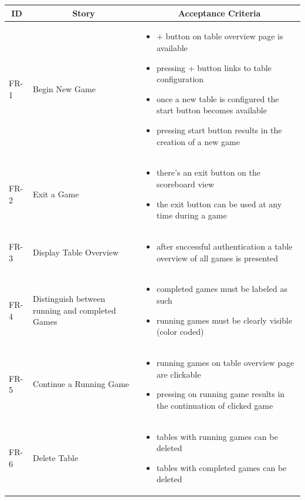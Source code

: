 \begin{longtable} { | m{1.25cm} | m{5.75cm} | m{6cm} | }
    \hline
    \multicolumn{1}{|c|}{\textbf{ID}} & \multicolumn{1}{|c|}{ \textbf{Story} } & \multicolumn{1}{|c|}{ \textbf{Acceptance Criteria} } \\
    \endhead
    \hline
    FR-1 & Begin New Game & \begin{itemize}[-]
        \item + button on table overview page is available
        \item pressing + button links to table configuration
        \item once a new table is configured the start button becomes available
        \item pressing start button results in the creation of a new game
    \end{itemize}\\
    \hline
    FR-2 & Exit a Game & \begin{itemize}[-]
        \item there's an exit button on the scoreboard view
        \item the exit button can be used at any time during a game
    \end{itemize}\\
    \hline
    FR-3 & Display Table Overview & \begin{itemize}[-]
        \item after successful authentication a table overview of all games is presented
    \end{itemize}\\
    \hline
    FR-4 & Distinguish between running and completed Games & \begin{itemize}[-]
        \item completed games must be labeled as such
        \item running games must be clearly visible (color coded)
    \end{itemize} \\
    \hline
    FR-5 & Continue a Running Game & \begin{itemize}[-]
        \item running games on table overview page are clickable
        \item pressing on running game results in the continuation of clicked game
    \end{itemize}\\
    \hline
    FR-6 & Delete Table & \begin{itemize}[-]
        \item tables with running games can be deleted
        \item tables with completed games can be deleted
    \end{itemize}\\
    \hline
\end{longtable}

